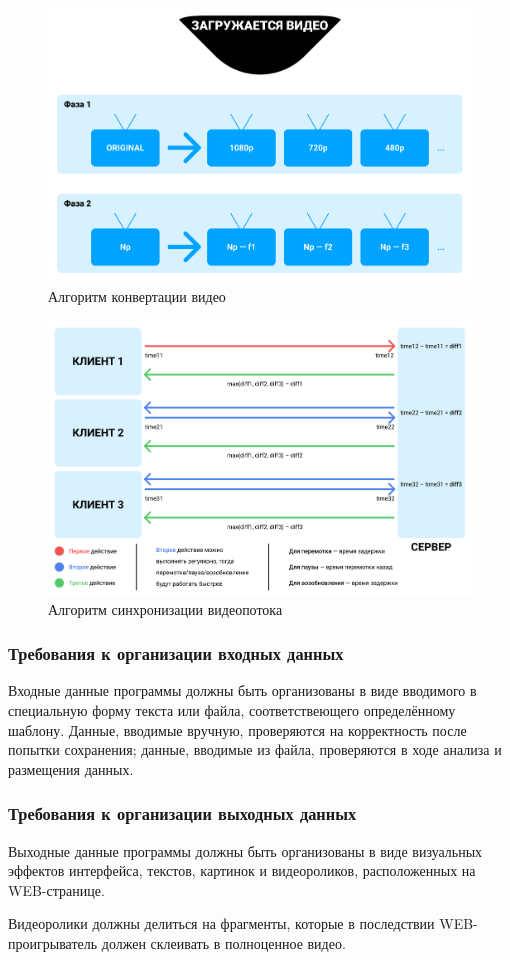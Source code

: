 \begin{figure}[p]
    \centering
    \includegraphics[width=0.97\linewidth]{../images/server_converting.png}
    \caption{Алгоритм конвертации видео}
    \label{ris:server_converting}
\end{figure}

\begin{figure}[p]
    \centering
    \includegraphics[width=0.97\linewidth]{../images/interaction_format.png}
    \caption{Алгоритм синхронизации видеопотока}
    \label{ris:interaction_format}
\end{figure}

\newpage

\subsubsection{Требования к организации входных данных}
Входные данные программы должны быть организованы в виде вводимого в специальную форму текста или файла,
соответствеющего определённому шаблону.
Данные, вводимые вручную, проверяются на корректность после попытки сохранения;
данные, вводимые из файла, проверяются в ходе анализа и размещения данных.

\subsubsection{Требования к организации выходных данных}
Выходные данные программы должны быть организованы в виде визуальных эффектов интерфейса, текстов, картинок и
видеороликов, расположенных на WEB-странице.

Видеоролики должны делиться на фрагменты, которые в последствии WEB-проигрыватель должен склеивать в полноценное видео.